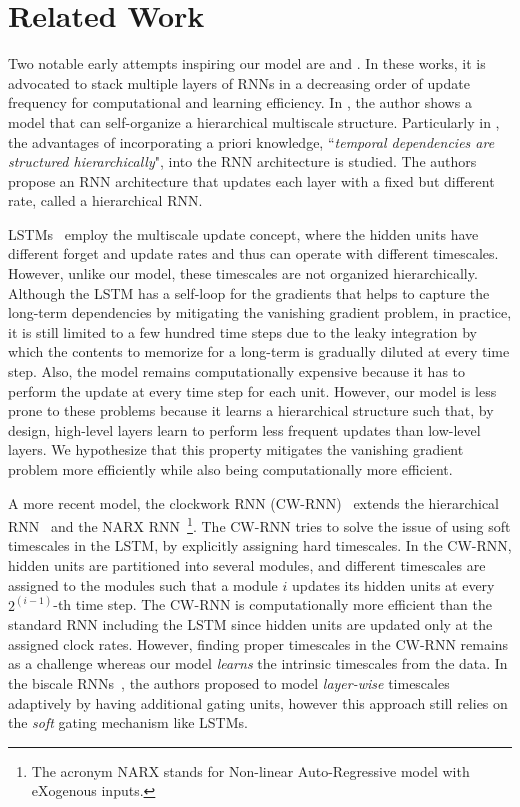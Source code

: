 \section{Related Work}
\label{sec:related_work}
Two notable early attempts inspiring our model are \citet{schmidhuber1992learning} and \citet{el1995hierarchical}. 
In these works, it is advocated to stack multiple layers of RNNs in a decreasing order of update frequency for computational and learning efficiency. In \citet{schmidhuber1992learning}, the author shows a model that can self-organize a hierarchical multiscale structure. Particularly in \citet{el1995hierarchical}, the advantages of incorporating a priori knowledge,
``\textit{temporal dependencies are structured hierarchically}", into the RNN architecture is studied. The authors propose an RNN architecture that updates each layer with a fixed but different rate, called a hierarchical RNN.

LSTMs~\citep{hochreiter1997long} employ the multiscale update concept, where the hidden units have different forget and update rates and thus can operate with different timescales. However, unlike our model, these timescales are not organized hierarchically. Although the LSTM has a self-loop for the gradients that helps to capture the long-term dependencies by mitigating the vanishing gradient problem, in practice, it is still limited to a few hundred time steps due to the leaky integration by which the contents to memorize for a long-term is gradually diluted at every time step. Also, the model remains computationally expensive because it has to perform the update at every time step for each unit. However, our model is less prone to these problems because it learns a hierarchical structure such that, by design, high-level layers learn to perform less frequent updates than low-level layers. We hypothesize that this property mitigates the vanishing gradient problem more efficiently while also being computationally more efficient. 

A more recent model, the clockwork RNN (CW-RNN)~\citep{koutnik2014clockwork} extends the hierarchical RNN~\citep{el1995hierarchical} and the NARX RNN~\citep{lin1996learning}\footnote{The acronym NARX stands for Non-linear Auto-Regressive model with eXogenous inputs.}. The CW-RNN tries to solve the issue of using soft timescales in the LSTM, by explicitly assigning hard timescales. In the CW-RNN, hidden units are partitioned into several modules, and different timescales are assigned to the modules such that a module $i$ updates its hidden units at every $2^{(i-1)}$-th time step. The CW-RNN is computationally more efficient than the standard RNN including the LSTM since hidden units are updated only at the assigned clock rates. However, finding proper timescales in the CW-RNN remains as a challenge whereas our model \textit{learns} the intrinsic timescales from the data. In the biscale RNNs~\citep{chung2016character}, the authors proposed to model \textit{layer-wise} timescales adaptively by having additional gating units, however this approach still relies on the \textit{soft} gating mechanism like LSTMs.


